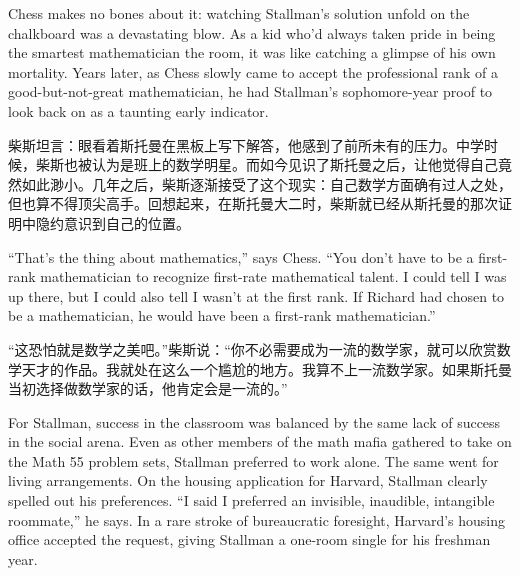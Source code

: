 \ifdefined\vone
\ifdefined\eng
Chess makes no bones about it: watching Stallman's solution unfold on the chalkboard was a devastating blow. As a kid who'd always taken pride in being the smartest mathematician the room, it was like catching a glimpse of his own mortality. Years later, as Chess slowly came to accept the professional rank of a good-but-not-great mathematician, he had Stallman's sophomore-year proof to look back on as a taunting early indicator. 
\fi

\ifdefined\chs
柴斯坦言：眼看着斯托曼在黑板上写下解答，他感到了前所未有的压力。中学时候，柴斯也被认为是班上的数学明星。而如今见识了斯托曼之后，让他觉得自己竟然如此渺小。几年之后，柴斯逐渐接受了这个现实：自己数学方面确有过人之处，但也算不得顶尖高手。回想起来，在斯托曼大二时，柴斯就已经从斯托曼的那次证明中隐约意识到自己的位置。
\fi
\fi

\ifdefined\eng
``That's the thing about mathematics,'' says Chess. ``You don't have to be a first-rank mathematician to recognize first-rate mathematical talent. I could tell I was up there, but I could also tell I wasn't at the first rank. If Richard had chosen to be a mathematician, he would have been a first-rank mathematician.''\ifdefined\vtwo{}\fi
\fi

\ifdefined\chs
``这恐怕就是数学之美吧。''柴斯说：``你不必需要成为一流的数学家，就可以欣赏数学天才的作品。我就处在这么一个尴尬的地方。我算不上一流数学家。如果斯托曼当初选择做数学家的话，他肯定会是一流的。''\ifdefined\vtwo{}\fi
\fi

\ifdefined\eng
For Stallman, success in the classroom was balanced by the same lack of success in the social arena. Even as other members of the math mafia gathered to take on the Math 55 problem sets, Stallman preferred to work alone. The same went for living arrangements. On the housing application for Harvard, Stallman clearly spelled out his preferences. ``I said I preferred an invisible, inaudible, intangible roommate,'' he says. In a rare stroke of bureaucratic foresight, Harvard's housing office accepted the request, giving Stallman a one-room single for his freshman year.
\fi

